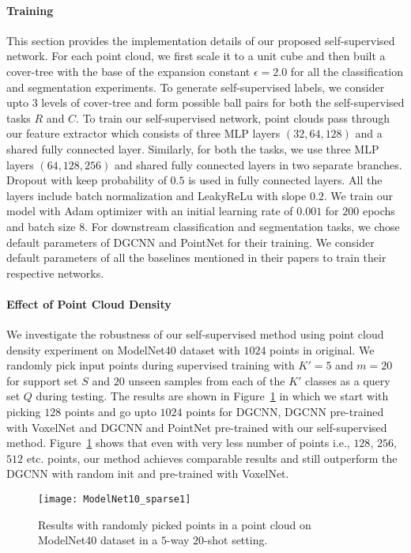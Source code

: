 \documentclass{article}
\begin{document}
\paragraph{Training}
This section provides the implementation details of our proposed self-supervised network. For each point cloud, we first scale it to a unit cube and then built a cover-tree with the base of the expansion constant $\epsilon=2.0$ for all the classification and segmentation experiments. To generate self-supervised labels, we consider upto $3$ levels of cover-tree and form possible ball pairs for both the self-supervised tasks $R$ and $C$. To train our self-supervised network, point clouds pass through our feature extractor which consists of three MLP layers $(32, 64, 128)$ and a shared fully connected layer. Similarly, for both the tasks, we use three MLP layers $(64, 128, 256)$ and shared fully connected layers in two separate branches. Dropout with keep probability of $0.5$ is used in fully connected layers. All the layers include batch normalization and LeakyReLu with slope $0.2$. We train our model with Adam optimizer with an initial learning rate of $0.001$ for $200$ epochs and batch size $8$. For downstream classification and segmentation tasks, we chose default parameters of DGCNN and PointNet for their training. We consider default parameters of all the baselines mentioned in their papers to train their respective networks.

\paragraph{Effect of Point Cloud Density}
We investigate the robustness of our self-supervised method using point cloud density experiment on ModelNet40 dataset with $1024$ points in original. We randomly pick input points during supervised training with $K'=5$ and $m=20$ for support set $S$ and $20$ unseen samples from each of the $K'$ classes as a query set $Q$ during testing. The results are shown in Figure~\ref{fig:sparse} in which we start with picking $128$ points and go upto $1024$ points for DGCNN, DGCNN pre-trained with VoxelNet and DGCNN and PointNet pre-trained with our self-supervised method. Figure~\ref{fig:sparse} shows that even with very less number of points i.e., $128$, $256$, $512$ etc. points, our method achieves comparable results and still outperform the DGCNN with random init and pre-trained with VoxelNet.
\begin{figure}[h]
\centering
	\texttt{[image: ModelNet10\_sparse1]}
	\caption{Results with randomly picked points in a point cloud on ModelNet40 dataset in a $5$-way $20$-shot setting.}
	\label{fig:sparse}
\end{figure}
\end{document}
